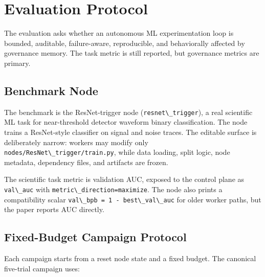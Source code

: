 \section{Evaluation Protocol}\label{evaluation-protocol}

The evaluation asks whether an autonomous ML experimentation loop is bounded, auditable, failure-aware, reproducible, and behaviorally affected by governance memory. The task metric is still reported, but governance metrics are primary.

\subsection{Benchmark Node}\label{benchmark-node}

The benchmark is the ResNet-trigger node (\passthrough{\lstinline!resnet\_trigger!}), a real scientific ML task for near-threshold detector waveform binary classification. The node trains a ResNet-style classifier on signal and noise traces. The editable surface is deliberately narrow: workers may modify only \passthrough{\lstinline!nodes/ResNet\_trigger/train.py!}, while data loading, split logic, node metadata, dependency files, and artifacts are frozen.

The scientific task metric is validation AUC, exposed to the control plane as \passthrough{\lstinline!val\_auc!} with \passthrough{\lstinline!metric\_direction=maximize!}. The node also prints a compatibility scalar \passthrough{\lstinline!val\_bpb = 1 - best\_val\_auc!} for older worker paths, but the paper reports AUC directly.

\subsection{Fixed-Budget Campaign Protocol}\label{fixed-budget-campaign-protocol}

Each campaign starts from a reset node state and a fixed budget. The canonical five-trial campaign uses:

